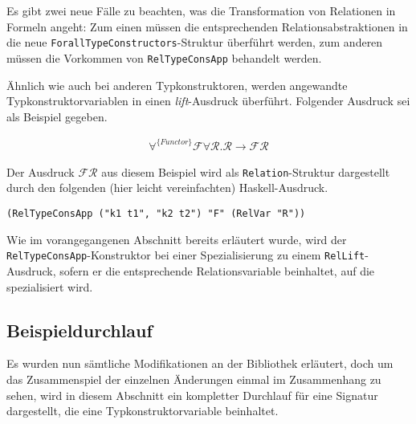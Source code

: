 Es gibt zwei neue Fälle zu beachten, was die Transformation von Relationen in Formeln angeht: Zum einen müssen die
entsprechenden Relationsabstraktionen in die neue \texttt{ForallTypeConstructors}-Struktur überführt werden, zum anderen
müssen die Vorkommen von \texttt{RelTypeConsApp} behandelt werden.

Ähnlich wie auch bei anderen Typkonstruktoren, werden angewandte Typkonstruktorvariablen in einen \textit{lift}-Ausdruck
überführt. Folgender Ausdruck sei als Beispiel gegeben.

\begin{align*}
\forall^{\{Functor\}} \mathcal{F} \forall \mathcal{R} . \mathcal{R} \rightarrow \mathcal{F} \mathcal{R}
\end{align*}

Der Ausdruck $\mathcal{F} \mathcal{R}$ aus diesem Beispiel wird als \texttt{Relation}-Struktur dargestellt durch den folgenden
(hier leicht vereinfachten) Haskell-Ausdruck.

\begin{verbatim}
(RelTypeConsApp ("k1 t1", "k2 t2") "F" (RelVar "R"))
\end{verbatim}


Wie im vorangegangenen Abschnitt bereits erläutert wurde, wird der \texttt{RelTypeConsApp}-Konstruktor bei einer Spezialisierung
zu einem \texttt{RelLift}-Ausdruck, sofern er die entsprechende Relationsvariable beinhaltet, auf die spezialisiert wird.

\subsection{Beispieldurchlauf}

Es wurden nun sämtliche Modifikationen an der Bibliothek erläutert, doch um das Zusammenspiel der einzelnen Änderungen
einmal im Zusammenhang zu sehen, wird in diesem Abschnitt ein kompletter Durchlauf für eine Signatur dargestellt, die eine
Typkonstruktorvariable beinhaltet.

